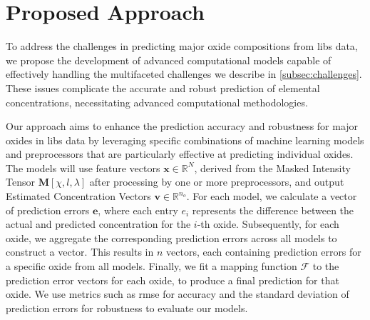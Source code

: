 \section{Proposed Approach}
To address the challenges in predicting major oxide compositions from \gls{libs} data, we propose the development of advanced computational models capable of effectively handling the multifaceted challenges we describe in \ref{subsec:challenges}.
These issues complicate the accurate and robust prediction of elemental concentrations, necessitating advanced computational methodologies. 

Our approach aims to enhance the prediction accuracy and robustness for major oxides in \gls{libs} data by leveraging specific combinations of machine learning models and preprocessors that are particularly effective at predicting individual oxides.
The models will use feature vectors $\mathbf{x} \in \mathbb{R}^N$, derived from the Masked Intensity Tensor $\mathbf{M}[\chi, l, \lambda]$ after processing by one or more preprocessors, and output Estimated Concentration Vectors $\mathbf{v} \in \mathbb{R}^{n_o}$. 
For each model, we calculate a vector of prediction errors $\mathbf{e}$, where each entry $e_i$ represents the difference between the actual and predicted concentration for the $i$-th oxide. Subsequently, for each oxide, we aggregate the corresponding prediction errors across all models to construct a vector. 
This results in $n$ vectors, each containing prediction errors for a specific oxide from all models.
Finally, we fit a mapping function $\mathcal{F}$ to the prediction error vectors for each oxide, to produce a final prediction for that oxide.
We use metrics such as \gls{rmse} for accuracy and the standard deviation of prediction errors for robustness to evaluate our models.


